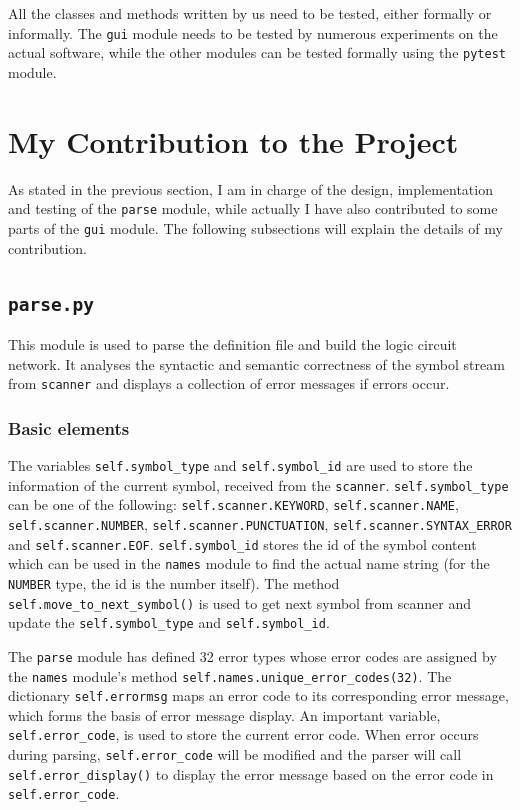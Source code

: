 \documentclass[10pt,a4paper]{article}
\begin{document}
All the classes and methods written by us need to be tested, either
formally or informally. The \texttt{gui} module needs to be tested by
numerous experiments on the actual software, while the other modules
can be tested formally using the \texttt{pytest} module.


\section{My Contribution to the Project}
\label{sec:org57dc4e1}

As stated in the previous section, I am in charge of the design,
implementation and testing of the \texttt{parse} module, while actually I
have also contributed to some parts of the \texttt{gui} module. The following
subsections will explain the details of my contribution.

\subsection{\texttt{parse.py}}
\label{sec:orgdb599ed}

This module is used to parse the definition file and build the logic
circuit network. It analyses the syntactic and semantic correctness of
the symbol stream from \texttt{scanner} and displays a collection of error
messages if errors occur.

\subsubsection{Basic elements}
\label{sec:org19573e6}

The variables \texttt{self.symbol\_type} and \texttt{self.symbol\_id} are used to
store the information of the current symbol, received from the
\texttt{scanner}. \texttt{self.symbol\_type} can be one of the following:
\texttt{self.scanner.KEYWORD}, \texttt{self.scanner.NAME}, \texttt{self.scanner.NUMBER},
\texttt{self.scanner.PUNCTUATION}, \texttt{self.scanner.SYNTAX\_ERROR} and
\texttt{self.scanner.EOF}. \texttt{self.symbol\_id} stores the id of the symbol
content which can be used in the \texttt{names} module to find the actual
name string (for the \texttt{NUMBER} type, the id is the number itself). The
method \texttt{self.move\_to\_next\_symbol()} is used to get next symbol from
scanner and update the \texttt{self.symbol\_type} and \texttt{self.symbol\_id}.

The \texttt{parse} module has defined 32 error types whose error codes are
assigned by the \texttt{names} module's method
\texttt{self.names.unique\_error\_codes(32)}. The dictionary \texttt{self.errormsg}
maps an error code to its corresponding error message, which forms the
basis of error message display. An important variable,
\texttt{self.error\_code}, is used to store the current error code. When error
occurs during parsing, \texttt{self.error\_code} will be modified and the
parser will call \texttt{self.error\_display()} to display the error message
based on the error code in \texttt{self.error\_code}.
\end{document}
